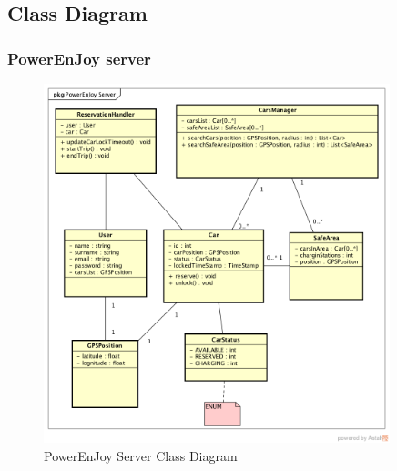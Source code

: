 \pagebreak
\subsection{Class Diagram}
\subsubsection{PowerEnJoy server}
\begin{figure}[h]
	\centering
	\includegraphics[width=380px]{img/classdiagram_server}
	\caption{PowerEnJoy Server Class Diagram}
\end{figure}
\FloatBarrier
